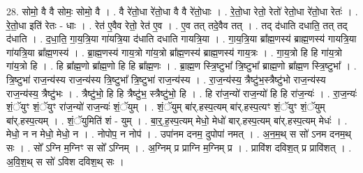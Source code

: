 \documentclass[17pt]{extarticle}
\begin{document}
28. सोमो॒ वै वै सोमः॒ सोमो॒ वै । . वै रे॑तो॒धा रे॑तो॒धा वै वै रे॑तो॒धाः । . रे॒तो॒धा रेतो॒ रेतो॑ रेतो॒धा रे॑तो॒धा रेतः॑ । . रे॒तो॒धा इति॑ रेतः - धाः । . रेत॑ ए॒वैव रेतो॒ रेत॑ ए॒व । . ए॒व तत् तदे॒वैव तत् । . तद् द॑धाति दधाति॒ तत् तद् द॑धाति । . द॒धा॒ति॒ गा॒य॒त्रि॒या गा॑यत्रि॒या द॑धाति दधाति गायत्रि॒या । . गा॒य॒त्रि॒या ब्रा᳚ह्म॒णस्य॑ ब्राह्म॒णस्य॑ गायत्रि॒या गा॑यत्रि॒या ब्रा᳚ह्म॒णस्य॑ । . ब्रा॒ह्म॒णस्य॑ गाय॒त्रो गा॑य॒त्रो ब्रा᳚ह्म॒णस्य॑ ब्राह्म॒णस्य॑ गाय॒त्रः । . गा॒य॒त्रो हि हि गा॑य॒त्रो गा॑य॒त्रो हि । . हि ब्रा᳚ह्म॒णो ब्रा᳚ह्म॒णो हि हि ब्रा᳚ह्म॒णः । . ब्रा॒ह्म॒ण स्त्रि॒ष्टुभा᳚ त्रि॒ष्टुभा᳚ ब्राह्म॒णो ब्रा᳚ह्म॒ण स्त्रि॒ष्टुभा᳚ । . त्रि॒ष्टुभा॑ राज॒न्य॑स्य राज॒न्य॑स्य त्रि॒ष्टुभा᳚ त्रि॒ष्टुभा॑ राज॒न्य॑स्य । . रा॒ज॒न्य॑स्य॒ त्रैष्टु॑भ॒स्त्रैष्टु॑भो राज॒न्य॑स्य राज॒न्य॑स्य॒ त्रैष्टु॑भः । . त्रैष्टु॑भो॒ हि हि त्रैष्टु॑भ॒ स्त्रैष्टु॑भो॒ हि । . हि रा॑ज॒न्यो॑ राज॒न्यो॑ हि हि रा॑ज॒न्यः॑ । . रा॒ज॒न्यः॑ शं॒ॅयुꣳ शं॒ॅयुꣳ रा॑ज॒न्यो॑ राज॒न्यः॑ शं॒ॅयुम् । . शं॒ॅयुम् बा॑र्.हस्प॒त्यम् बा॑र्.हस्प॒त्यꣳ शं॒ॅयुꣳ शं॒ॅयुम् बा॑र्.हस्प॒त्यम् । . शं॒ॅयुमिति॑ शं - युम् । . बा॒र्॒.ह॒स्प॒त्यम् मेधो॒ मेधो॑ बार्.हस्प॒त्यम् बा॑र्.हस्प॒त्यम् मेधः॑ । . मेधो॒ न न मेधो॒ मेधो॒ न । . नोपोप॒ न नोप॑ । . उपा॑नम दनम॒ दुपोपा॑ नमत् । . अ॒न॒म॒थ् स सो॑ ऽनम दनम॒थ् सः । . सो᳚ ऽग्नि म॒ग्निꣳ स सो᳚ ऽग्निम् । . अ॒ग्निम् प्र प्राग्नि म॒ग्निम् प्र । . प्रावि॑श दविश॒त् प्र प्रावि॑शत् । . अ॒वि॒श॒थ् स सो॑ ऽविश दविश॒थ् सः । \newline
\end{document}
